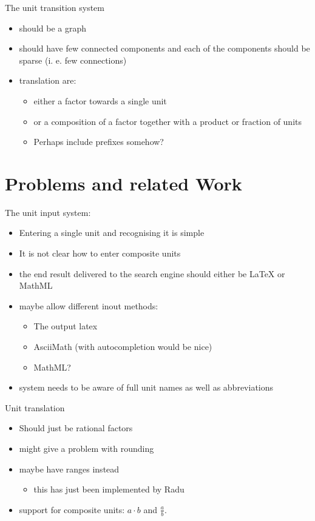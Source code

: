 \documentclass[11pt]{article}
\begin{document}
The unit transition system
\begin{itemize}
  \item should be a graph
  \item should have few connected components and each of the components should be sparse (i. e. few connections)
  \item translation are:
  \begin{itemize}
    \item either a factor towards a single unit
    \item or a composition of a factor together with a product or fraction of units 
    \item Perhaps include prefixes somehow?
  \end{itemize}
\end{itemize}


\section{Problems and related Work}
\label{sec:problems_relatedwork}

The unit input system:
\begin{itemize}
  \item Entering a single unit and recognising it is simple
  \item It is not clear how to enter composite units
  \item the end result delivered to the search engine should either be LaTeX or MathML
  \item maybe allow different inout methods:
  \begin{itemize}
    \item The output latex
    \item AsciiMath (with autocompletion would be nice)
    \item MathML?
  \end{itemize}
  \item system needs to be aware of full unit names as well as abbreviations
\end{itemize}

Unit translation
\begin{itemize}
  \item Should just be rational factors
  \item might give a problem with rounding
  \item maybe have ranges instead
  \begin{itemize}
    \item this has just been implemented by Radu 
  \end{itemize}
  \item support for composite units: $a \cdot{} b$ and $\frac{a}{b}$.
\end{itemize}
\end{document}
